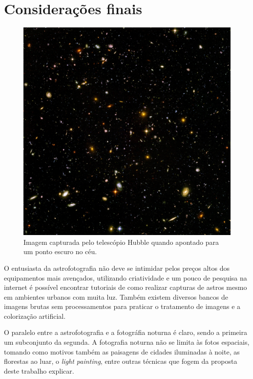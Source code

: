 \documentclass[
	article,			%
	12pt,				%
	oneside,			%
	a4paper,			%
	english,			%
	brazil,				%
	sumario=tradicional
	]{abntex2}
\begin{document}
\section{Considerações finais}
\label{conclusion}
\begin{figure}[th]
	\includegraphics[width=\linewidth,]{img/Hubble_ultra_deep_field}
	\caption{Imagem capturada pelo telescópio Hubble quando apontado para um ponto escuro no céu.}
	\label{fig:hubbledeepspace}
	\centering
\end{figure}

O entusiasta da astrofotografia não deve se intimidar pelos preços altos dos
equipamentos mais avençados, utilizando criatividade e um pouco de pesquisa na
internet é possível encontrar tutoriais de como realizar capturas de astros
mesmo em ambientes urbanos com muita luz. Também existem diversos bancos de
imagens brutas sem processamentos para praticar o tratamento de imagens e a
colorização artificial.

O paralelo entre a astrofotografia e a fotográfia noturna é claro, sendo a
primeira um subconjunto da segunda. A fotografia noturna não se limita às fotos
espaciais, tomando como motivos também as paisagens de cidades iluminadas à
noite, as florestas ao luar, o \textit{light painting}, entre outras técnicas que
fogem da proposta deste trabalho explicar.
\end{document}
